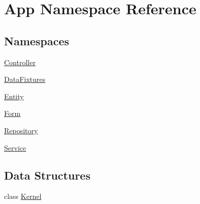 \hypertarget{namespace_app}{}\section{App Namespace Reference}
\label{namespace_app}
\subsection*{Namespaces}
\begin{DoxyCompactItemize}
\item 
 \mbox{\hyperlink{namespace_app_1_1_controller}{Controller}}
\item 
 \mbox{\hyperlink{namespace_app_1_1_data_fixtures}{Data\+Fixtures}}
\item 
 \mbox{\hyperlink{namespace_app_1_1_entity}{Entity}}
\item 
 \mbox{\hyperlink{namespace_app_1_1_form}{Form}}
\item 
 \mbox{\hyperlink{namespace_app_1_1_repository}{Repository}}
\item 
 \mbox{\hyperlink{namespace_app_1_1_service}{Service}}
\end{DoxyCompactItemize}
\subsection*{Data Structures}
\begin{DoxyCompactItemize}
\item 
class \mbox{\hyperlink{class_app_1_1_kernel}{Kernel}}
\end{DoxyCompactItemize}
